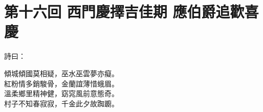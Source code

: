 
\chapter*{第十六回 西門慶擇吉佳期 應伯爵追歡喜慶}


詩曰：

\begin{myquote}
傾城傾國莫相疑，巫水巫雲夢亦癡。\\紅粉情多銷駿骨，金蘭誼薄惜蛾眉。{}\\溫柔鄉里精神健，窈窕風前意態奇。\\村子不知春寂寂，千金此夕故踟躕。
\end{myquote}

